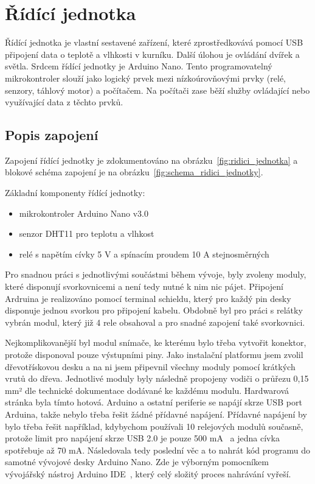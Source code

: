 \section{Řídící jednotka}\label{sec:ridici-jednotka}
Řídící jednotka je vlastní sestavené zařízení, které zprostředkovává pomocí USB připojení data o teplotě a vlhkosti v kurníku.
Další úlohou je ovládání dvířek a světla.
Srdcem řídící jednotky je Arduino Nano.
Tento programovatelný mikrokontroler slouží jako logický prvek mezi nízkoúrovňovými prvky (relé, senzory, táhlový motor) a počítačem.
Na počítači zase běží služby ovládající nebo využívající data z těchto prvků.

\subsection*{Popis zapojení}
Zapojení řídící jednotky je zdokumentováno na obrázku~\ref{fig:ridici_jednotka} a blokové schéma zapojení je na obrázku~\ref{fig:schema_ridici_jednotky}.

Základní komponenty řídící jednotky:
\begin{itemize}
    \item mikrokontroler Arduino Nano v3.0
    \item senzor DHT11 pro teplotu a vlhkost
    \item relé s napětím cívky 5 V a spínacím proudem 10 A stejnosměrných
\end{itemize}
Pro snadnou práci s jednotlivými součástmi během vývoje, byly zvoleny moduly, které disponují svorkovnicemi a není tedy nutné k nim nic pájet.
Připojení Ardruina je realizováno pomocí terminal schieldu, který pro každý pin desky disponuje jednou svorkou pro připojení kabelu.
Obdobně byl pro práci s relátky vybrán modul, který již 4 rele obsahoval a pro snadné zapojení také svorkovnici.

Nejkomplikovanější byl modul snímače, ke kterému bylo třeba vytvořit konektor, protože disponoval pouze výstupními piny.
Jako instalační platformu jsem zvolil dřevotřískovou desku a na ni jsem připevnil všechny moduly pomocí krátkých vrutů do dřeva.
Jednotlivé moduly byly následně propojeny vodiči o průřezu 0,15 mm² dle technické dokumentace dodávané ke každému modulu.
Hardwarová stránka byla tímto hotová.
\newline
Arduino a ostatní periferie se napájí skrze USB port Arduina, takže nebylo třeba řešit žádné přídavné napájení.
Přídavné napájení by bylo třeba řešit například, kdybychom používali 10 relejových modulů současně, protože limit pro napájení skrze USB 2.0 je pouze 500 mA~\cite{USB20proud} a jedna cívka spotřebuje až 70 mA.\newline
Následovala tedy poslední věc a to nahrát kód programu do samotné vývojové desky Arduino Nano.
Zde je výborným pomocníkem vývojářský nástroj Arduino IDE~\cite{arduino-ide}, který celý složitý proces nahrávání vyřeší.


